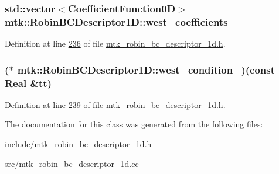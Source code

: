 \hypertarget{classmtk_1_1RobinBCDescriptor1D_a0a8a0dc4fa2dab02a9992094a3f5d0d6}{
\subsubsection[{west\+\_\+coefficients\+\_\+}]{\setlength{\rightskip}{0pt plus 5cm}std\+::vector$<${\bf Coefficient\+Function0\+D}$>$ mtk\+::\+Robin\+B\+C\+Descriptor1\+D\+::west\+\_\+coefficients\+\_\+\hspace{0.3cm}{\ttfamily [private]}}}\label{classmtk_1_1RobinBCDescriptor1D_a0a8a0dc4fa2dab02a9992094a3f5d0d6}


Definition at line \hyperlink{mtk__robin__bc__descriptor__1d_8h_source_l00236}{236} of file \hyperlink{mtk__robin__bc__descriptor__1d_8h_source}{mtk\+\_\+robin\+\_\+bc\+\_\+descriptor\+\_\+1d.\+h}.

\hypertarget{classmtk_1_1RobinBCDescriptor1D_ab4e2dd2c68d33d8fc82ba697d515ebd2}{
\subsubsection[{west\+\_\+condition\+\_\+}]{($\ast$ mtk\+::\+Robin\+B\+C\+Descriptor1\+D\+::west\+\_\+condition\+\_\+)(const {\bf Real} \&tt)\hspace{0.3cm}{\ttfamily [private]}}}\label{classmtk_1_1RobinBCDescriptor1D_ab4e2dd2c68d33d8fc82ba697d515ebd2}


Definition at line \hyperlink{mtk__robin__bc__descriptor__1d_8h_source_l00239}{239} of file \hyperlink{mtk__robin__bc__descriptor__1d_8h_source}{mtk\+\_\+robin\+\_\+bc\+\_\+descriptor\+\_\+1d.\+h}.



The documentation for this class was generated from the following files\+:\begin{DoxyCompactItemize}
\item 
include/\hyperlink{mtk__robin__bc__descriptor__1d_8h}{mtk\+\_\+robin\+\_\+bc\+\_\+descriptor\+\_\+1d.\+h}\item 
src/\hyperlink{mtk__robin__bc__descriptor__1d_8cc}{mtk\+\_\+robin\+\_\+bc\+\_\+descriptor\+\_\+1d.\+cc}\end{DoxyCompactItemize}
